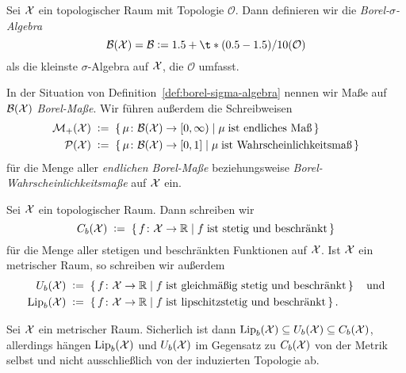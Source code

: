\documentclass[../main/main.tex]{subfiles}
\begin{document}
	\begin{Definition}
		\label{def:borel-sigma-algebra}
		Sei $\mathcal{X}$ ein topologischer Raum mit Topologie $\mathcal{O}$. Dann definieren wir die
		\emph{Borel-$\sigma$-Algebra} 
		$$\mathcal{B}(\X) = \mathcal{B} \defby \sigma(\mathcal{O})$$
		als die kleinste $\sigma$-Algebra auf $\mathcal{X}$, die $\mathcal{O}$ umfasst.
	\end{Definition}

	\begin{Definition}
		In der Situation von Definition~\ref{def:borel-sigma-algebra} nennen wir Maße auf $\mathcal{B}(\mathcal{X})$ \emph{Borel-Maße}. Wir führen außerdem die Schreibweisen
		\begin{align*}
			\mathcal{M}_{+}(\mathcal{X})  \; &\vcentcolon = \; \left\{\, \mu \colon \mathcal{B}(\mathcal{X}) \to [0,\infty) \; \middle| \; \mu \; 
				\text{ist endliches Maß} \,\right\} \\
			\mathcal{P}(\mathcal{X}) \; &\vcentcolon = \; \left\{\, \mu \colon \mathcal{B}(\mathcal{X}) \to [0,1] \; \middle| \; \mu \; 
				\text{ist Wahrscheinlichkeitsmaß} \,\right\}
		\end{align*}
		für die Menge aller \emph{endlichen Borel-Maße} beziehungsweise \emph{Borel-Wahrscheinlichkeitsmaße} auf $\mathcal{X}$ ein.
	\end{Definition}
	
	\begin{Definition}
		Sei $\mathcal{X}$ ein topologischer Raum. Dann schreiben wir
		\[ C_b(\mathcal{X}) \; \vcentcolon = \; \left\{\, f \colon \mathcal{X} \to \mathbb{R} \; \middle| \; f \; \text{ist stetig und beschränkt} \,\right\} \]
		für die Menge aller stetigen und beschränkten Funktionen auf $\mathcal{X}$. 
		Ist $\mathcal{X}$ ein metrischer Raum, so schreiben wir außerdem
		\begin{align*}
			U_b(\mathcal{X}) \; &\vcentcolon = \; \left\{\, f \colon \mathcal{X} \to \mathbb{R} \; \middle| \; f \; \text{ist gleichmäßig stetig und beschränkt} \,\right\} \quad \text{und} \\
			\mathrm{Lip}_b(\mathcal{X}) \; &\vcentcolon = \; \left\{\, f \colon \mathcal{X} \to \mathbb{R} \; \middle| \; f \; \text{ist lipschitzstetig und beschränkt} \,\right\} \text{.}
		\end{align*}
	\end{Definition}
	
	\begin{Bemerkung}
		Sei $\mathcal{X}$ ein metrischer Raum. Sicherlich ist dann $\mathrm{Lip}_b(\mathcal{X}) \subseteq U_b(\mathcal{X}) \subseteq C_b(\mathcal{X})$, allerdings hängen $\mathrm{Lip}_b(\mathcal{X})$ und $U_b(\mathcal{X})$ im Gegensatz 
		zu $C_b(\mathcal{X})$ von der Metrik selbst und nicht ausschließlich von der induzierten Topologie ab.
	\end{Bemerkung}
	
\end{document}
